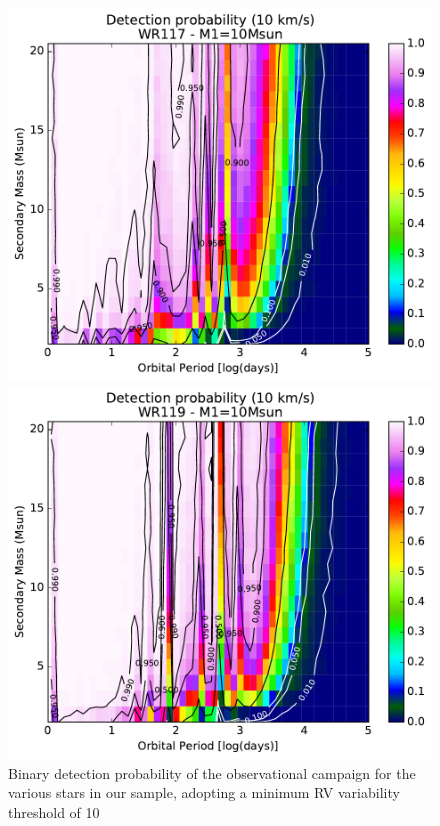 \begin{figure}[h!]
\begin{minipage}{0.49\textwidth}
    \end{minipage}
    \begin{minipage}{0.49\textwidth}
    \centering
    \includegraphics[width=\textwidth]{chapters/appendix3/image/117PM2_thres10_MAR31.pdf}
    \end{minipage}
    \begin{minipage}{0.49\textwidth}
    \centering
    \includegraphics[width=\textwidth]{chapters/appendix3/image/119PM2_thres10_MAR31.pdf}
    \end{minipage}
    \caption{Binary detection probability of the observational campaign for the various stars in our sample, adopting a minimum RV variability threshold of 10~\kms}
    \label{f:Pdetect1}
\end{figure}
